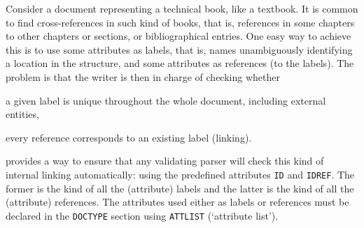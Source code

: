 Consider a document representing a technical book, like a textbook. It
is common to find cross\hyp{}references in such kind of books, that
is, references in some chapters to other chapters or sections, or
bibliographical entries. One easy way to achieve this is to use some
attributes as labels, that is, names unambiguously identifying a
location in the structure, and some attributes as references (to the
labels). The problem is that the writer is then in charge of checking
whether
\begin{itemize*}

  \item a given label is unique throughout the whole document, 
        including external entities,

  \item every reference corresponds to an existing label (linking).

\end{itemize*}
\label{xml_intro:ATTLIST}
\XML provides a way to ensure that any validating parser will check
this kind of internal linking automatically: using the predefined
attributes \texttt{ID} and \texttt{IDREF}. The former is the kind of
all the (attribute) labels and the latter is the kind of all the
(attribute) references. The attributes used either as labels or
references must be declared in the \texttt{DOCTYPE} section using
\texttt{ATTLIST} (`attribute list').

